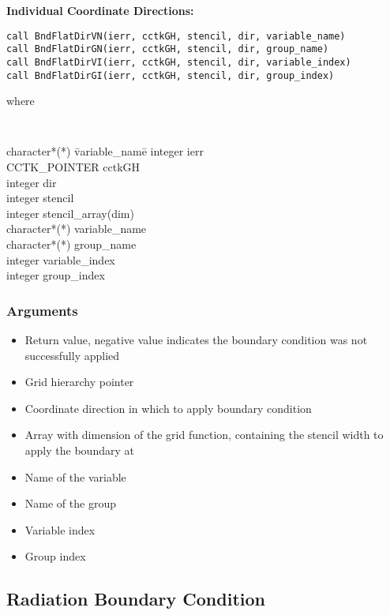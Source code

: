 \documentclass{article}
\begin{document}
{\bf Individual Coordinate Directions:}
\begin{verbatim}
call BndFlatDirVN(ierr, cctkGH, stencil, dir, variable_name)
call BndFlatDirGN(ierr, cctkGH, stencil, dir, group_name)
call BndFlatDirVI(ierr, cctkGH, stencil, dir, variable_index)
call BndFlatDirGI(ierr, cctkGH, stencil, dir, group_index)
\end{verbatim}
where
{\tt
\begin{tabbing}
character*(*) \= variable\_name\=\kill
integer \> ierr \\
CCTK\_POINTER \> cctkGH\\
integer \> dir\\
integer \> stencil\\
integer \> stencil\_array(dim)\\
character*(*) \> variable\_name\\
character*(*) \> group\_name\\
integer \> variable\_index\\
integer \> group\_index\\
\end{tabbing}
}

\subsubsection*{Arguments}
\begin{itemize}
\item[{\tt ierr}] Return value, negative value indicates the
boundary condition was not successfully applied
\item[{\tt cctkGH}] Grid hierarchy pointer
\item[{\tt dir}] Coordinate direction in which to apply boundary condition
\item[{\tt stencil\_size}] Array with dimension of the grid function, containing the stencil width to apply the boundary at
\item[{\tt variable\_name}] Name of the variable
\item[{\tt group\_name}] Name of the group
\item[{\tt variable\_index}] Variable index
\item[{\tt group\_index}] Group index
\end{itemize}



\subsection{Radiation Boundary Condition}
\end{document}
